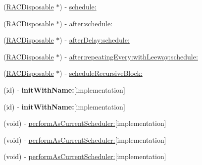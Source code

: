 \begin{DoxyCompactItemize}
\item 
(\mbox{\hyperlink{interface_r_a_c_disposable}{R\+A\+C\+Disposable}} $\ast$) -\/ \mbox{\hyperlink{interface_r_a_c_scheduler_ab8e7e6634a86734797fa8db0919f9c16}{schedule\+:}}
\item 
(\mbox{\hyperlink{interface_r_a_c_disposable}{R\+A\+C\+Disposable}} $\ast$) -\/ \mbox{\hyperlink{interface_r_a_c_scheduler_ada2a84ec6cf8eed043bcef654334c601}{after\+:schedule\+:}}
\item 
(\mbox{\hyperlink{interface_r_a_c_disposable}{R\+A\+C\+Disposable}} $\ast$) -\/ \mbox{\hyperlink{interface_r_a_c_scheduler_acc37181185138cba688a6e90da1a62fe}{after\+Delay\+:schedule\+:}}
\item 
(\mbox{\hyperlink{interface_r_a_c_disposable}{R\+A\+C\+Disposable}} $\ast$) -\/ \mbox{\hyperlink{interface_r_a_c_scheduler_ae0e70791e20c43df48d62eedbfa236ba}{after\+:repeating\+Every\+:with\+Leeway\+:schedule\+:}}
\item 
(\mbox{\hyperlink{interface_r_a_c_disposable}{R\+A\+C\+Disposable}} $\ast$) -\/ \mbox{\hyperlink{interface_r_a_c_scheduler_aff5ee7293a775dc51a4ae35fb91ab13b}{schedule\+Recursive\+Block\+:}}
\item 
\mbox{\label{interface_r_a_c_scheduler_a7c9bb193d22bc46e731b394b9abaa730}} 
(id) -\/ {\bfseries init\+With\+Name\+:}{\ttfamily  \mbox{[}implementation\mbox{]}}
\item 
\mbox{\label{interface_r_a_c_scheduler_a7c9bb193d22bc46e731b394b9abaa730}} 
(id) -\/ {\bfseries init\+With\+Name\+:}{\ttfamily  \mbox{[}implementation\mbox{]}}
\item 
(void) -\/ \mbox{\hyperlink{interface_r_a_c_scheduler_a2aaec93a6a9e3dbe316ee320a312ca2e}{perform\+As\+Current\+Scheduler\+:}}{\ttfamily  \mbox{[}implementation\mbox{]}}
\item 
(void) -\/ \mbox{\hyperlink{interface_r_a_c_scheduler_a2aaec93a6a9e3dbe316ee320a312ca2e}{perform\+As\+Current\+Scheduler\+:}}{\ttfamily  \mbox{[}implementation\mbox{]}}
\item 
(void) -\/ \mbox{\hyperlink{interface_r_a_c_scheduler_a2aaec93a6a9e3dbe316ee320a312ca2e}{perform\+As\+Current\+Scheduler\+:}}{\ttfamily  \mbox{[}implementation\mbox{]}}
\end{DoxyCompactItemize}
